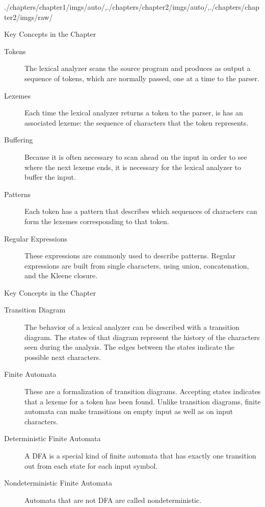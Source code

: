\begin{graphicspathcontext}{{./chapters/chapter1/imgs/auto/},{./chapters/chapter2/imgs/auto/},{./chapters/chapter2/imgs/raw/}}
\begin{bibunit}[apalike]
\begin{frame}{{Key Concepts} in the Chapter}
	\begin{description}
	\item[Tokens] The lexical analyzer scans the source program and produces as output a sequence of tokens, which are normally passed, one at a time to the parser.
	\item[Lexemes] Each time the lexical analyzer returns a token to the parser, is has an associated lexeme: the sequence of characters that the token represents.
	\item[Buffering] Because it is often necessary to scan ahead on the input in order to see where the next lexeme ends, it is necessary for the lexical analyzer to buffer the input.
	\item[Patterns] Each token has a pattern that describes which sequences of characters can form the lexemes corresponding to that token.
	\item[Regular Expressions] These expressions are commonly used to describe patterns. Regular expressions are built from single characters, using union, concatenation, and the Kleene closure.
	\end{description}
\end{frame}

\begin{frame}{{Key Concepts} in the Chapter \insertcontinuationtext}
	\begin{description}
	\item[Transition Diagram] The behavior of a lexical analyzer can be described with a transition diagram. The states of that diagram represent the history of the characters seen during the analysis. The edges between the states indicate the possible next characters.
	\item[Finite Automata] These are a formalization of transition diagrams. Accepting states indicates that a lexeme for a token has been found. Unlike transition diagrams, finite automata can make transitions on empty input as well as on input characters.
	\item[Deterministic Finite Automata] A DFA is a special kind of finite automata that has exactly one transition out from each state for each input symbol.
	\item[Nondeterministic Finite Automata] Automata that are not DFA are called nondeterministic.
	\end{description}
\end{frame}


\end{bibunit}
\end{graphicspathcontext}
